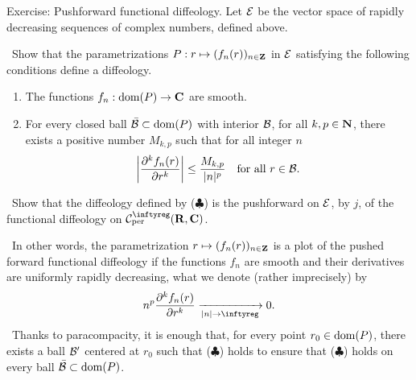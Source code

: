 \begin{Article}{Exercise: Pushforward functional diffeology.}{}
  Let $\mathcal{E}$ be the vector space of rapidly decreasing sequences of complex numbers,
  defined above.
  
  ~Show that the parametrizations $P : r \mapsto (f_n(r))_{n\in\mathbf{Z}}$ in $\mathcal{E}$ satisfying the following
  conditions define a diffeology.
  \begin{enumerate}
    \item The functions $f_n : \mathrm{dom}(P) \to \mathbf{C}$ are smooth.
    \item For every closed ball $\bar{\mathcal{B}}\subset \mathrm{dom}(P)$ with interior $\mathcal{B}$,
    for all $k,p \in \mathbf{N}$,
    there exists
    a positive number $M_{k,p}$ such that for all integer $n$
    \begin{equation}
      \renewcommand{\theequation}{$\clubsuit$}
      \left| {\partial^k f_n(r) \over \partial r^k} \right| \leq {M_{k,p} \over \Modulus{n}^p} \quad \mbox{for all $r\in \cB$}.
    \end{equation}
  \end{enumerate}
  
  ~Show that the diffeology defined by ($\clubsuit$) is the pushforward on $\mathcal{E}$, by $j$,
  of the functional diffeology on $\Cinfty_{\rm per}(\RR,\CC)$.
  
  ~In other words, the parametrization $r \mapsto (f_n(r))_{n\in \mathbf{Z}}$  is a plot of the pushed forward functional
  diffeology if the functions $f_n$ are smooth and their derivatives are uniformly rapidly decreasing,
  what we denote (rather imprecisely) by
  $$
    n^p {\partial^k f_n(r) \over \partial r^k} \xrightarrow[\Modulus{n} \to \infty]{} 0.
    $$
  ~Thanks to paracompacity, it is enough that, for every point $r_0\in\mathrm{dom}(P)$, there exists a ball $\mathcal{B}'$
  centered at $r_0$ such that ($\clubsuit$) holds to ensure that ($\clubsuit$) holds on  every ball $\bar{\mathcal{B}}\subset\mathrm{dom}(P)$.
\end{Article}

